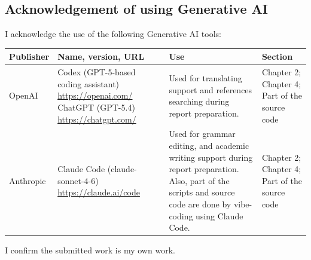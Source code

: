 \subsection*{Acknowledgement of using Generative AI}
{}
I acknowledge the use of the following Generative AI tools:
\begin{table}[H]
    \renewcommand{\arraystretch}{1.3}
    \small
    \setlength{\tabcolsep}{0.1cm}
    \begin{tabular}{|p{2.0cm}|p{3.8cm}|p{5.6cm}|p{3.5cm}|}
        \hline
        \textbf{Publisher} & \textbf{Name, version, URL} & \centering \textbf{Use} & \textbf{Section} \\
        \hline
        OpenAI & Codex (GPT-5-based coding assistant) \newline \url{https://openai.com/} 
        \newline ChatGPT (GPT-5.4) \newline
        \url{https://chatgpt.com/} & Used for translating support and references searching during report preparation. & Chapter 2; Chapter 4; Part of the source code \\
        \hline
        Anthropic & Claude Code (claude-sonnet-4-6) \newline \url{https://claude.ai/code} & Used for grammar editing, and academic writing support during report preparation. Also, part of the scripts and source code are done by vibe-coding using Claude Code. & Chapter 2; Chapter 4; Part of the source code \\
        \hline
    \end{tabular}
\end{table}

I confirm the submitted work is my own work.